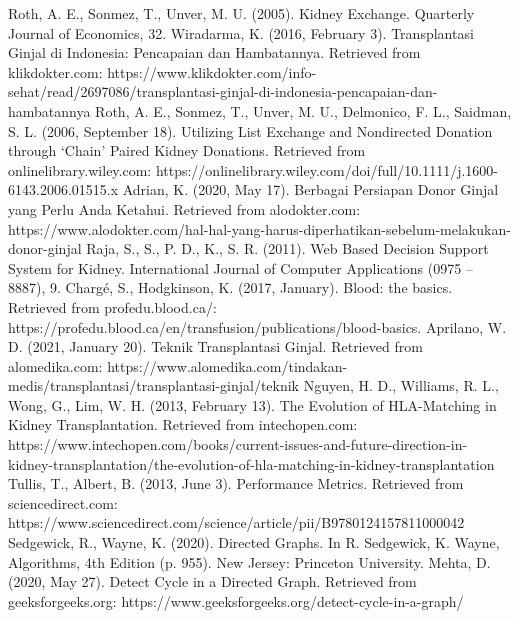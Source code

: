 \documentclass[conference]{IEEEtran}
\begin{document}
\begin{thebibliography}{00}
 Roth, A. E., Sonmez, T., Unver, M. U. (2005). Kidney Exchange. Quarterly Journal of Economics, 32.
 Wiradarma, K. (2016, February 3). Transplantasi Ginjal di Indonesia: Pencapaian dan Hambatannya. Retrieved from klikdokter.com: https://www.klikdokter.com/info-sehat/read/2697086/transplantasi-ginjal-di-indonesia-pencapaian-dan-hambatannya
 Roth, A. E., Sonmez, T., Unver, M. U., Delmonico, F. L., Saidman, S. L. (2006, September 18). Utilizing List Exchange and Nondirected Donation through ‘Chain’ Paired Kidney Donations. Retrieved from onlinelibrary.wiley.com: https://onlinelibrary.wiley.com/doi/full/10.1111/j.1600-6143.2006.01515.x
 Adrian, K. (2020, May 17). Berbagai Persiapan Donor Ginjal yang Perlu Anda Ketahui. Retrieved from alodokter.com: https://www.alodokter.com/hal-hal-yang-harus-diperhatikan-sebelum-melakukan-donor-ginjal
 Raja, S., S., P. D., K., S. R. (2011). Web Based Decision Support System for Kidney. International Journal of Computer Applications (0975 – 8887), 9.
 Chargé, S., Hodgkinson, K. (2017, January). Blood: the basics. Retrieved from profedu.blood.ca/: https://profedu.blood.ca/en/transfusion/publications/blood-basics.
 Aprilano, W. D. (2021, January 20). Teknik Transplantasi Ginjal. Retrieved from alomedika.com: https://www.alomedika.com/tindakan-medis/transplantasi/transplantasi-ginjal/teknik
 Nguyen, H. D., Williams, R. L., Wong, G., Lim, W. H. (2013, February 13). The Evolution of HLA-Matching in Kidney Transplantation. Retrieved from intechopen.com: https://www.intechopen.com/books/current-issues-and-future-direction-in-kidney-transplantation/the-evolution-of-hla-matching-in-kidney-transplantation
 Tullis, T., Albert, B. (2013, June 3). Performance Metrics. Retrieved from sciencedirect.com: https://www.sciencedirect.com/science/article/pii/B9780124157811000042
 Sedgewick, R., Wayne, K. (2020). Directed Graphs. In R. Sedgewick, K. Wayne, Algorithms, 4th Edition (p. 955). New Jersey: Princeton University.
 Mehta, D. (2020, May 27). Detect Cycle in a Directed Graph. Retrieved from geeksforgeeks.org: https://www.geeksforgeeks.org/detect-cycle-in-a-graph/
\end{thebibliography}
\end{document}
